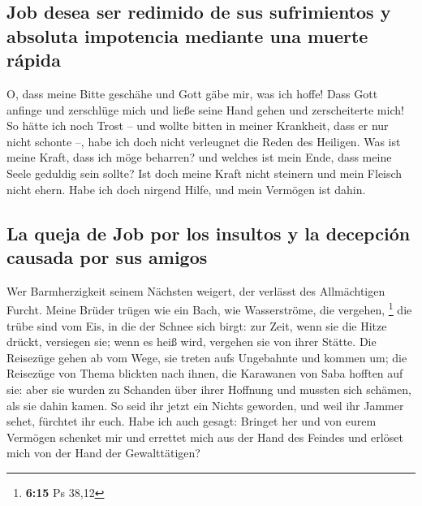 \hypertarget{job-desea-ser-redimido-de-sus-sufrimientos-y-absoluta-impotencia-mediante-una-muerte-ruxe1pida}{%
\subsection{Job desea ser redimido de sus sufrimientos y absoluta
impotencia mediante una muerte
rápida}\label{job-desea-ser-redimido-de-sus-sufrimientos-y-absoluta-impotencia-mediante-una-muerte-ruxe1pida}}

 O, dass meine Bitte geschähe und Gott gäbe mir, was ich
hoffe!  Dass Gott anfinge und zerschlüge mich und ließe
seine Hand gehen und zerscheiterte mich!  So hätte ich
noch Trost -- und wollte bitten in meiner Krankheit, dass er nur nicht
schonte --, habe ich doch nicht verleugnet die Reden des Heiligen.
 Was ist meine Kraft, dass ich möge beharren? und welches
ist mein Ende, dass meine Seele geduldig sein sollte? 
Ist doch meine Kraft nicht steinern und mein Fleisch nicht ehern.
 Habe ich doch nirgend Hilfe, und mein Vermögen ist
dahin.

\hypertarget{la-queja-de-job-por-los-insultos-y-la-decepciuxf3n-causada-por-sus-amigos}{%
\subsection{La queja de Job por los insultos y la decepción causada por
sus
amigos}\label{la-queja-de-job-por-los-insultos-y-la-decepciuxf3n-causada-por-sus-amigos}}

 Wer Barmherzigkeit seinem Nächsten weigert, der verlässt
des Allmächtigen Furcht.  Meine Brüder trügen wie ein
Bach, wie Wasserströme, die vergehen, \footnote{\textbf{6:15} Ps 38,12}
 die trübe sind vom Eis, in die der Schnee sich birgt:
 zur Zeit, wenn sie die Hitze drückt, versiegen sie; wenn
es heiß wird, vergehen sie von ihrer Stätte.  Die
Reisezüge gehen ab vom Wege, sie treten aufs Ungebahnte und kommen um;
 die Reisezüge von Thema blickten nach ihnen, die
Karawanen von Saba hofften auf sie:  aber sie wurden zu
Schanden über ihrer Hoffnung und mussten sich schämen, als sie dahin
kamen.  So seid ihr jetzt ein Nichts geworden, und weil
ihr Jammer sehet, fürchtet ihr euch.  Habe ich auch
gesagt: Bringet her und von eurem Vermögen schenket mir 
und errettet mich aus der Hand des Feindes und erlöset mich von der Hand
der Gewalttätigen?

